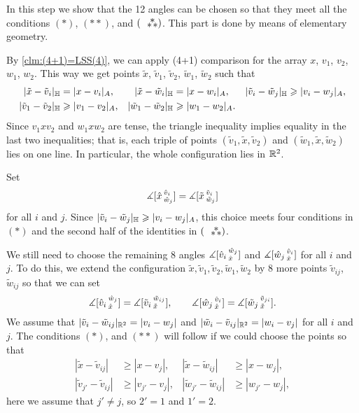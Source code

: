 \documentclass{article}
\begin{document}
In this step we show that the 12 angles can be chosen so that they meet all the conditions $({*})$, $({*}{*})$, and $(\asterism)$.
This part is done by means of elementary geometry.

By \ref{clm:(4+1)=LSS(4)}, we can apply (4+1) comparison for the array $x$, $v_1$, $v_2$, $w_1$, $w_2$. This way we get points $\tilde x$, $\tilde v_1$, $\tilde v_2$, $\tilde w_1$, $\tilde w_2$ such that 
\begin{align*}
|\tilde x-\tilde v_i|_{\mathbb H}&=|x-v_i|_{A},
&
|\tilde x-\tilde w_i|_{\mathbb H}&=|x-w_i|_{A},
&
|\tilde v_i-\tilde w_j|_{\mathbb H}&\geqslant |v_i-w_j|_{A},
\\
|\tilde v_1-\tilde v_2|_{\mathbb H}&\geqslant |v_1-v_2|_{A},
&
|\tilde w_1-\tilde w_2|_{\mathbb H}&\geqslant |w_1-w_2|_{A}.
\end{align*}
Since $v_1xv_2$ and $w_1xw_2$ are tense,
the triangle inequality implies equality in the last two inequalities;
that is, each triple of points $(\tilde v_1,\tilde x,\tilde v_2)$ and $(\tilde w_1,\tilde x,\tilde w_2)$ lies on one line.
In particular, the whole configuration lies in $\mathbb{R}^2$.

Set 
\[\measuredangle [\hat x\,{}^{\hat v_i}_{\hat w_j}]
=
\measuredangle [\tilde x\,{}^{\tilde v_i}_{\tilde w_j}]\]
for all $i$ and $j$.
Since $|\tilde v_i-\tilde w_j|_{\mathbb H}\geqslant |v_i-w_j|_{A}$, this choice meets four conditions in $({*})$ and the second half of the identities in $(\asterism)$.

We still need to choose the remaining 8 angles $\measuredangle [\hat v_i\,{}^{\hat w_j}_{\hat x}]$ and $\measuredangle [\hat w_j\,{}^{\hat v_i}_{\hat x}]$ for all $i$ and $j$.
To do this, we extend the configuration $\tilde x,\tilde v_1,\tilde v_2,\tilde w_1,\tilde w_2$ by 8 more points 
$\tilde v_{ij}$, $\tilde w_{ij}$ so that we can set 
\[
\measuredangle [\hat v_i\,{}^{\hat w_j}_{\hat x}]=\measuredangle [\tilde v_i\,{}^{\tilde w_{ij}}_{\tilde x}],
\qquad
\measuredangle [\hat w_j\,{}^{\hat v_i}_{\hat x}]=\measuredangle [\tilde w_j\,{}^{\tilde v_{ji}}_{\tilde x}].
\]
We assume that $|\tilde v_i-\tilde w_{ij}|_{\mathbb{R}^2}=|v_i-w_j|$ and $|\tilde w_i-\tilde v_{ij}|_{\mathbb{R}^2}=|w_i-v_j|$ for all $i$ and~$j$.
The conditions $({*})$, and $({*}{*})$ will follow if we could choose the points so that
\begin{align*}
|\tilde x-\tilde v_{ij}|&\ge | x-v_j|,
&
|\tilde x-\tilde w_{ij}|&\ge | x-w_j|,
\\
|\tilde v_{j'}-\tilde v_{ij}|&\ge | v_{j'}-v_j|,
&
|\tilde w_{j'}-\tilde w_{ij}|&\ge |w_{j'}-w_j|,
\end{align*}
here we assume that $j'\ne j$, so $2'=1$ and $1'=2$.
\end{document}
